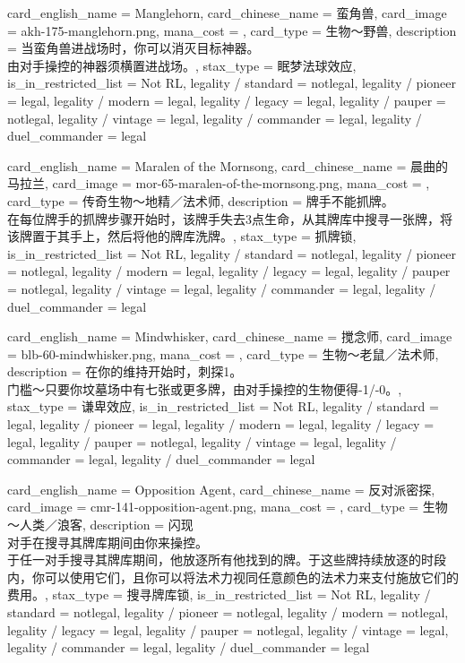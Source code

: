 \documentclass[lang = cn, color = black, 10pt]{AllThatStax}
\begin{document}
\card
{
	card_english_name = {Manglehorn},
	card_chinese_name = {蛮角兽},
	card_image = akh-175-manglehorn.png,
	mana_cost = ,
	card_type = 生物～野兽,
	description = {当蛮角兽进战场时，你可以消灭目标神器。\\
由对手操控的神器须横置进战场。},
	stax_type = 眠梦法球效应,
	is_in_restricted_list = Not RL,
	legality / standard = notlegal,
	legality / pioneer = legal,
	legality / modern = legal,
	legality / legacy = legal,
	legality / pauper = notlegal,
	legality / vintage = legal,
	legality / commander = legal,
	legality / duel_commander = legal
}

\card
{
	card_english_name = {Maralen of the Mornsong},
	card_chinese_name = {晨曲的马拉兰},
	card_image = mor-65-maralen-of-the-mornsong.png,
	mana_cost = ,
	card_type = 传奇生物～地精／法术师,
	description = {牌手不能抓牌。\\
在每位牌手的抓牌步骤开始时，该牌手失去3点生命，从其牌库中搜寻一张牌，将该牌置于其手上，然后将他的牌库洗牌。},
	stax_type = 抓牌锁,
	is_in_restricted_list = Not RL,
	legality / standard = notlegal,
	legality / pioneer = notlegal,
	legality / modern = legal,
	legality / legacy = legal,
	legality / pauper = notlegal,
	legality / vintage = legal,
	legality / commander = legal,
	legality / duel_commander = legal
}

\card
{
	card_english_name = {Mindwhisker},
	card_chinese_name = {搅念师},
	card_image = blb-60-mindwhisker.png,
	mana_cost = ,
	card_type = 生物～老鼠／法术师,
	description = {在你的维持开始时，刺探1。\\
门槛～只要你坟墓场中有七张或更多牌，由对手操控的生物便得-1/-0。},
	stax_type = 谦卑效应,
	is_in_restricted_list = Not RL,
	legality / standard = legal,
	legality / pioneer = legal,
	legality / modern = legal,
	legality / legacy = legal,
	legality / pauper = notlegal,
	legality / vintage = legal,
	legality / commander = legal,
	legality / duel_commander = legal
}

\card
{
	card_english_name = {Opposition Agent},
	card_chinese_name = {反对派密探},
	card_image = cmr-141-opposition-agent.png,
	mana_cost = ,
	card_type = 生物～人类／浪客,
	description = {闪现\\
对手在搜寻其牌库期间由你来操控。\\
于任一对手搜寻其牌库期间，他放逐所有他找到的牌。于这些牌持续放逐的时段内，你可以使用它们，且你可以将法术力视同任意颜色的法术力来支付施放它们的费用。},
	stax_type = 搜寻牌库锁,
	is_in_restricted_list = Not RL,
	legality / standard = notlegal,
	legality / pioneer = notlegal,
	legality / modern = notlegal,
	legality / legacy = legal,
	legality / pauper = notlegal,
	legality / vintage = legal,
	legality / commander = legal,
	legality / duel_commander = legal
}
\end{document}
